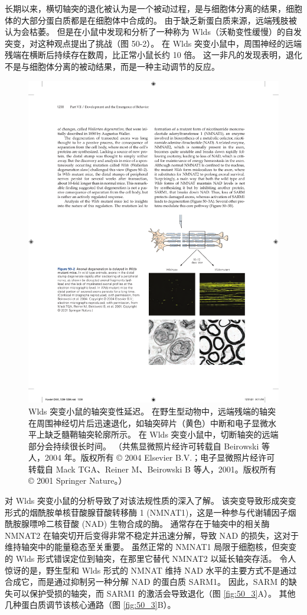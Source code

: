 长期以来，横切轴突的退化被认为是一个被动过程，是与细胞体分离的结果，细胞体的大部分蛋白质都是在细胞体中合成的。 由于缺乏新蛋白质来源，远端残肢被认为会枯萎。 但是在小鼠中发现和分析了一种称为 Wlds（沃勒变性缓慢）的自发突变，对这种观点提出了挑战（图 50-2）。 
在 Wlds 突变小鼠中，周围神经的远端残端在横断后持续存在数周，比正常小鼠长约 10 倍。 这一非凡的发现表明，退化不是与细胞体分离的被动结果，而是一种主动调节的反应。

\begin{figure}[htbp]
	\centering
	\includegraphics[width=0.6\linewidth]{chap50/fig_50_2}
	\caption{Wlds 突变小鼠的轴突变性延迟。 在野生型动物中，远端残端的轴突在周围神经切片后迅速退化，如轴突碎片（黄色）中断和电子显微水平上缺乏髓鞘轴突轮廓所示。 在 Wlds 突变小鼠中，切断轴突的远端部分会持续很长时间。 （共焦显微照片经许可转载自 Beirowski 等人，2004 年。版权所有 © 2004 Elsevier B.V.；电子显微照片经许可转载自 Mack TGA、Reiner M、Beirowski B 等人，2001。版权所有 © 2001 Springer Nature。）}
	\label{fig:50_2}
\end{figure}

对 Wlds 突变小鼠的分析导致了对该法规性质的深入了解。 该突变导致形成突变形式的烟酰胺单核苷酸腺苷酸转移酶 1 (NMNAT1)，这是一种参与代谢辅因子烟酰胺腺嘌呤二核苷酸 (NAD) 生物合成的酶。 通常存在于轴突中的相关酶 NMNAT2 在轴突切开后变得非常不稳定并迅速分解，导致 NAD 的损失，这对于维持轴突中的能量稳态至关重要。 虽然正常的 NMNAT1 局限于细胞核，但突变的 Wlds 形式错误定位到轴突，在那里它替代 NMNAT2 以延长轴突存活。 令人惊讶的是，野生型和 Wlds 形式的 NMNAT 维持 NAD 水平的主要方式不是通过合成它，而是通过抑制另一种分解 NAD 的蛋白质 SARM1。 
因此，SARM 的缺失可以保护受损的轴突，而 SARM1 的激活会导致退化（图 \ref{fig:50_3}A）。 
其他几种蛋白质调节该核心通路（图 \ref{fig:50_3}B）。

